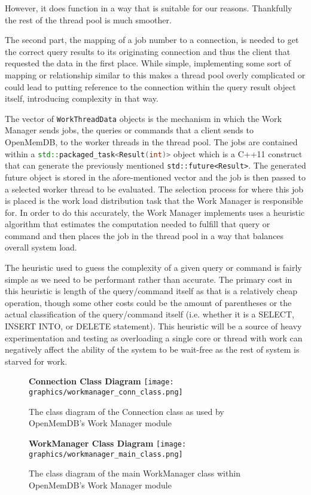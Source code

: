 \documentclass[letterpaper, 12pt]{article}
\begin{document}
  However, it does function in a way that is suitable for our reasons. Thankfully the rest of the thread
  pool is much smoother.
  \par\vspace{\baselineskip}
  The second part, the mapping of a job number to a connection, is needed to get the correct query results
  to its originating connection and thus the client that requested the data in the first place. While simple, 
  implementing some sort of mapping or relationship similar to this makes a thread pool overly complicated
  or could lead to putting reference to the connection within the query result object itself, introducing
  complexity in that way.
  \par\vspace{\baselineskip}
  The vector of \lstinline[]|WorkThreadData| objects is the mechanism in 
  which the Work Manager sends jobs, the queries or commands that a client sends to OpenMemDB, to the 
  worker threads in the thread pool. The jobs are contained within a \lstinline[language=C++]|std::packaged_task<Result(int)>|
  object which is a C++11 construct that can generate the previously mentioned \lstinline|std::future<Result>|.
  The generated future object is stored in the afore-mentioned vector and the job is then passed to a selected
  worker thread to be evaluated. The selection process for where this job is placed is the work load distribution
  task that the Work Manager is responsible for. In order to do this accurately, the Work Manager implements
  uses a heuristic algorithm that estimates the computation needed to fulfill that query or command
  and then places the job in the thread pool in a way that balances overall system load.
  \par\vspace{\baselineskip}
  The heuristic used to guess the complexity of a given query or command is fairly simple as we need to
  be performant rather than accurate. The primary cost in this heuristic is length of the query/command itself
  as that is a relatively cheap operation, though some other costs could be the amount of parentheses
  or the actual classification of the query/command itself (i.e. whether it is a SELECT, INSERT INTO, or DELETE statement).
  This heuristic will be a source of heavy experimentation and testing as overloading a single core or thread
  with work can negatively affect the ability of the system to be wait-free as the rest of system is 
  starved for work.
  \par\vspace{\baselineskip}
  \begin{figure}
   \centering
   \textbf{Connection Class Diagram}
   \texttt{[image: graphics/workmanager\_conn\_class.png]}
   \caption{The class diagram of the Connection class as used by OpenMemDB's Work Manager module}
  \end{figure}
  \begin{figure}
   \centering
   \textbf{WorkManager Class Diagram}
   \texttt{[image: graphics/workmanager\_main\_class.png]}
   \caption{The class diagram of the main WorkManager class within OpenMemDB's Work Manager module}
  \end{figure}
  
\end{document}
